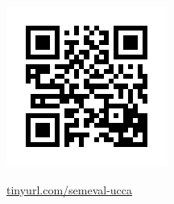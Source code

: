 \documentclass[a0,portrait]{a0poster}
\begin{document}
\begin{multicols}{2}
{\begin{multicols}{2}
\begin{adjustbox}{margin=3mm,frame,minipage=1.1\columnwidth}
\begin{minipage}{.3\textwidth}\includegraphics[width=\textwidth]{qr}\end{minipage}
\hfill
\begin{minipage}{.6\textwidth}\Large\url{tinyurl.com/semeval-ucca}\end{minipage}
\end{adjustbox}
\end{multicols}
}

\end{multicols}
\end{document}
